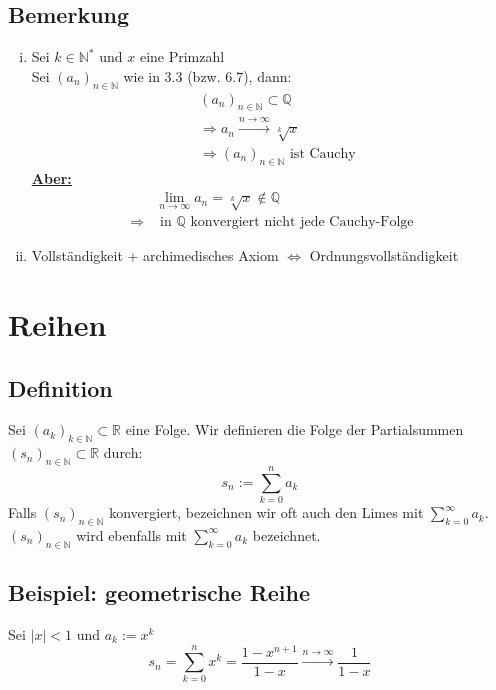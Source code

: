 \subsection{Bemerkung} %
\label{sub:bemerkung}
\begin{enumerate}[(i)]
	\item Sei $k \in \mathds{N}^*$ und $x$ eine Primzahl \\
	Sei $(a_n)_{n \in \mathds{N}}$ wie in 3.3 (bzw. 6.7), dann:
	\begin{align*}
		&(a_n)_{n \in \mathds{N}} \subset \mathds{Q} \tag{nach 6.7 folgt} \\
		&\Rightarrow a_n \xrightarrow{n \to \infty} \sqrt[k]{x} \tag{nach 6.9 folgt} \\
		&\Rightarrow (a_n)_{n \in \mathds{N}} \text{ ist Cauchy}
	\end{align*}
	\underline{\textbf{Aber:}} 
	\begin{align*}
		&\lim\limits_{n \to \infty} a_n = \sqrt[k]{x} \not\in \mathds{Q} \tag{wie in Aufgabe 4, Blatt 3} \\
		\Rightarrow &\text{ in } \mathds{Q} \text{ konvergiert nicht jede Cauchy-Folge}
	\end{align*}
	\item Vollständigkeit + archimedisches Axiom $\Leftrightarrow$ Ordnungsvollständigkeit
\end{enumerate}

\section{Reihen} %
\label{sec:reihen}

\subsection{Definition} %
\label{sub:definition}
Sei $(a_k)_{k \in \mathds{N}} \subset \mathds{R}$ eine Folge. Wir definieren die Folge der Partialsummen $(s_n)_{n \in \mathds{N}} \subset \mathds{R}$ durch:
\[
	s_n := \sum\limits_{k=0}^{n} a_k
\]
Falls $(s_n)_{n \in \mathds{N}}$ konvergiert, bezeichnen wir oft auch den Limes mit $\sum\limits_{k=0}^{\infty} a_k$. \\
$(s_n)_{n \in \mathds{N}}$ wird ebenfalls mit $\sum\limits_{k=0}^{\infty} a_k$ bezeichnet.

\subsection{Beispiel: geometrische Reihe} %
\label{sub:beispiel}
Sei $|x| < 1$ und $a_k := x^k$
\[
	s_n = \sum\limits_{k=0}^{n} x^k = \frac{1-x^{n+1}}{1-x} \xrightarrow{n \to \infty} \frac{1}{1-x}
\]

